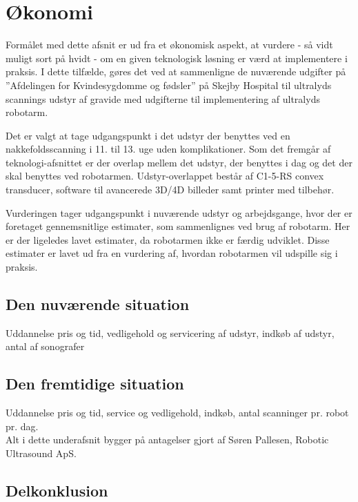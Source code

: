 \chapter{Økonomi}
Formålet med dette afsnit er ud fra et økonomisk aspekt, at vurdere - så vidt muligt sort på hvidt - om en given teknologisk løsning er værd at implementere i praksis. I dette tilfælde, gøres det ved at sammenligne de nuværende udgifter på ”Afdelingen for Kvindesygdomme og fødsler” på Skejby Hospital til ultralyds scannings udstyr af gravide med udgifterne til implementering af ultralyds robotarm.  

Det er valgt at tage udgangspunkt i det udstyr der benyttes ved en nakkefoldsscanning i 11. til 13. uge uden komplikationer. Som det fremgår af teknologi-afsnittet er der overlap mellem det udstyr, der benyttes i dag og det der skal benyttes ved robotarmen. Udstyr-overlappet består af C1-5-RS convex transducer, software til avancerede 3D/4D billeder samt printer med tilbehør. 

Vurderingen tager udgangspunkt i nuværende udstyr og arbejdsgange, hvor der er foretaget gennemsnitlige estimater, som sammenlignes ved brug af robotarm. Her er der ligeledes lavet estimater, da robotarmen ikke er færdig udviklet. Disse estimater er lavet ud fra en vurdering af, hvordan robotarmen vil udspille sig i praksis. 

\section{Den nuværende situation}
Uddannelse pris og tid, vedligehold og servicering af udstyr, indkøb af udstyr, antal af sonografer

\section{Den fremtidige situation}
Uddannelse pris og tid, service og vedligehold, indkøb, antal scanninger pr. robot pr. dag. \\
Alt i dette underafsnit bygger på antagelser gjort af Søren Pallesen, Robotic Ultrasound ApS. 

\section{Delkonklusion}

